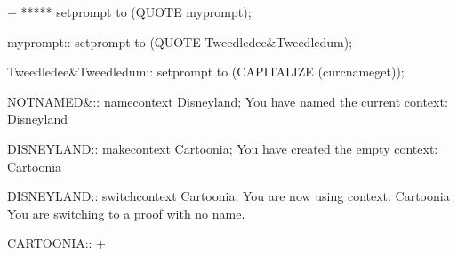 



\gfexample+
   ***** setprompt to (QUOTE myprompt);

   myprompt:: setprompt to (QUOTE Tweedledee\&Tweedledum);

   Tweedledee&Tweedledum:: setprompt to (CAPITALIZE (curcname\-get));

   NOTNAMED&:: namecontext Disneyland;
   You have named the current context: Disneyland

   DISNEYLAND:: makecontext Cartoonia;
   You have created the empty context: Cartoonia

   DISNEYLAND:: switchcontext Cartoonia;
   You are now using context: Cartoonia
   You are switching to a proof with no name.

   CARTOONIA:: 
+

